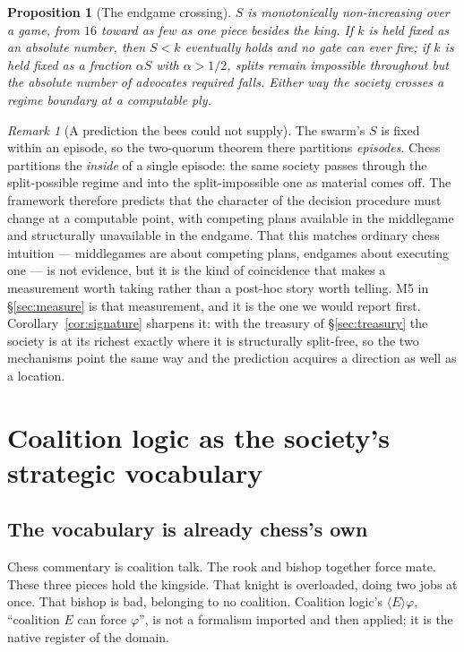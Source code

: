 \documentclass[11pt,a4paper]{article}
\theoremstyle{plain}
\newtheorem{proposition}[theorem]{Proposition}
\theoremstyle{definition}
\theoremstyle{remark}
\newtheorem{remark}[theorem]{Remark}
\begin{document}
\begin{proposition}[The endgame crossing]
\label{prop:crossing}
$S$ is monotonically non-increasing over a game, from $16$ toward as few as one
piece besides the king. If $k$ is held fixed as an absolute number, then
$S < k$ eventually holds and no gate can ever fire; if $k$ is held fixed as a
fraction $\alpha S$ with $\alpha > 1/2$, splits remain impossible throughout but
the absolute number of advocates required falls. Either way the society crosses
a regime boundary at a computable ply.
\end{proposition}

\begin{remark}[A prediction the bees could not supply]
\label{rem:predict}
The swarm's $S$ is fixed within an episode, so the two-quorum theorem there
partitions \emph{episodes}. Chess partitions the \emph{inside} of a single
episode: the same society passes through the split-possible regime and into the
split-impossible one as material comes off. The framework therefore predicts
that the character of the decision procedure must change at a computable point,
with competing plans available in the middlegame and structurally unavailable in
the endgame. That this matches ordinary chess intuition --- middlegames are
about competing plans, endgames about executing one --- is not evidence, but it
is the kind of coincidence that makes a measurement worth taking rather than a
post-hoc story worth telling. M5 in \S\ref{sec:measure} is that measurement, and
it is the one we would report first. Corollary~\ref{cor:signature} sharpens it:
with the treasury of \S\ref{sec:treasury} the society is at its richest exactly
where it is structurally split-free, so the two mechanisms point the same way and
the prediction acquires a direction as well as a location.
\end{remark}

\section{Coalition logic as the society's strategic vocabulary}
\label{sec:coalition}

\subsection{The vocabulary is already chess's own}

Chess commentary is coalition talk. The rook and bishop together force mate.
These three pieces hold the kingside. That knight is overloaded, doing two jobs
at once. That bishop is bad, belonging to no coalition. Coalition logic's
$\langle E \rangle\varphi$, ``coalition $E$ can force $\varphi$'', is not a
formalism imported and then applied; it is the native register of the domain.
\end{document}
